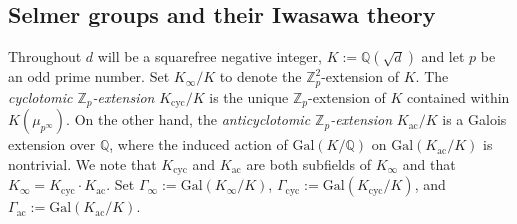 \documentclass[12pt]{amsart}
\numberwithin{equation}{section}
\begin{document}
\subsection{Selmer groups and their Iwasawa theory}\label{s 2.1}
Throughout $d$ will be a squarefree negative integer, $K := \mathbb{Q}(\sqrt{d})$ and let $ p $ be an odd prime number. Set $ K_\infty/K$ to denote the $\mathbb{Z}_p^2$-extension of $ K $. The \textit{cyclotomic $\mathbb{Z}_p$-extension} $ K_{\mathrm{cyc}}/K $ is the unique $\mathbb{Z}_p$-extension of $K$ contained within $ K(\mu_{p^\infty}) $. On the other hand, the \textit{anticyclotomic $\mathbb{Z}_p$-extension} $ K_{\mathrm{ac}}/K $ is a Galois extension over $\mathbb{Q}$, where the induced action of $\mathrm{Gal}(K/\mathbb{Q})$ on $\mathrm{Gal}(K_{\mathrm{ac}}/K)$ is nontrivial. We note that $ K_{\mathrm{cyc}} $ and $ K_{\mathrm{ac}} $ are both subfields of $ K_\infty $ and that $ K_{\infty}=K_{\mathrm{cyc}} \cdot K_{\mathrm{ac}} $. Set $\Gamma_\infty := \mathrm{Gal}(K_\infty/K)$, $\Gamma_{\mathrm{cyc}} := \mathrm{Gal}(K_{\mathrm{cyc}}/K)$, and $\Gamma_{\mathrm{ac}} := \mathrm{Gal}(K_{\mathrm{ac}}/K)$.
\end{document}
